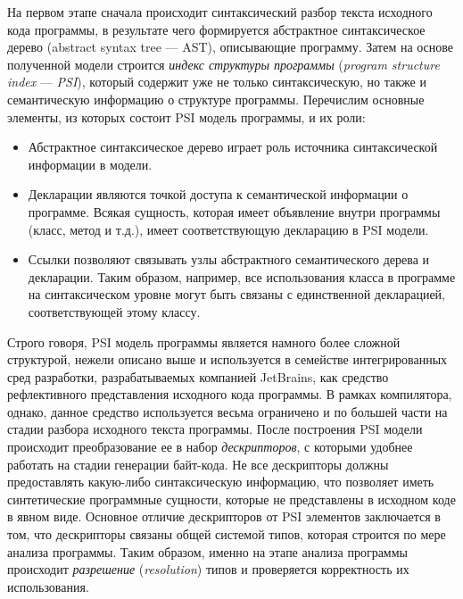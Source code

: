 На первом этапе сначала происходит синтаксический разбор текста исходного кода программы, в результате чего формируется абстрактное синтаксическое дерево (abstract syntax tree --- AST), описывающие программу. Затем на основе полученной модели строится \emph{индекс структуры программы} (\emph{program structure index} --- \emph{PSI}), который содержит уже не только синтаксическую, но также и семантическую информацию о структуре программы. Перечислим основные элементы, из которых состоит PSI модель программы, и их роли:
\begin{itemize}
    \item Абстрактное синтаксическое дерево играет роль источника синтаксической информации в модели.
    \item Декларации являются точкой доступа к семантической информации о программе. Всякая сущность, которая имеет объявление внутри программы (класс, метод и т.д.), имеет соответствующую декларацию в PSI модели.
    \item Ссылки позволяют связывать узлы абстрактного семантического дерева и декларации. Таким образом, например, все использования класса в программе на синтаксическом уровне могут быть связаны с единственной декларацией, соответствующей этому классу. 
\end{itemize}
Строго говоря, PSI модель программы является намного более сложной структурой, нежели описано выше и используется в семействе интегрированных сред разработки, разрабатываемых компанией JetBrains, как средство рефлективного представления исходного кода программы. В рамках компилятора, однако, данное средство используется весьма ограничено и по большей части на стадии разбора исходного текста программы. После построения PSI модели происходит преобразование ее в набор \emph{дескрипторов}, с которыми удобнее работать на стадии генерации байт-кода. Не все дескрипторы должны предоставлять какую-либо синтаксическую информацию, что позволяет иметь синтетические программные сущности, которые не представлены в исходном коде в явном виде. Основное отличие дескрипторов от PSI элементов заключается в том, что дескрипторы связаны общей системой типов, которая строится по мере анализа программы. Таким образом, именно на этапе анализа программы происходит \emph{разрешение} (\emph{resolution}) типов и проверяется корректность их использования. 

